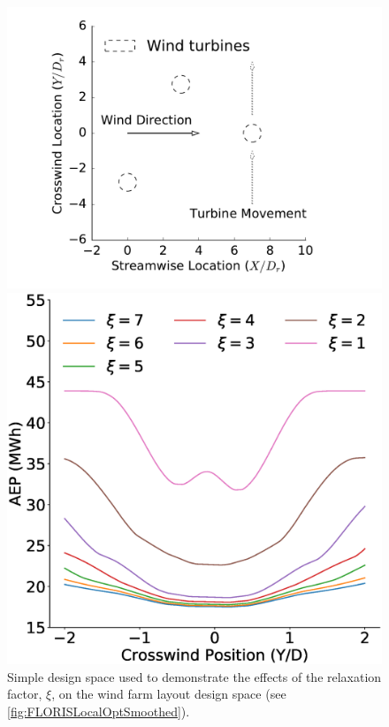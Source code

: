 \documentclass[a4paper]{jpconf}
\begin{document}
\begin{figure}[ht]
	\centering
	\begin{minipage}[t]{0.43\textwidth}
		\centering
		\includegraphics[width=\textwidth, trim={2cm 0cm 2cm 0cm}, clip]{smoothing_locations}
		\caption{Simple design space used to demonstrate the effects of the relaxation factor, $\xi$, on the wind farm layout design space (see \cref{fig:FLORISLocalOptSmoothed}).}
		\label{fig:smoothing_locations_FLORIS}
	\end{minipage}\hspace{1pc}
	\begin{minipage}[t]{0.52\textwidth}
		\centering
		\includegraphics[width=\textwidth]{FLORISWECMultipleTurbinesAEP}

\end{minipage}
\end{figure}
\end{document}
